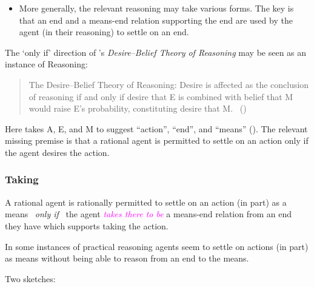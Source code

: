 \documentclass[10pt]{article}
\newenvironment{beamerblock}[1]{%
  \tcolorbox[standard,%
  no shadow,
  noparskip,
  colback=white,
  colframe=black,
  colbacktitle=white,
  coltitle=black,
  colupper=black,
  size=small,
  boxrule=.125mm,
  fonttitle=\bfseries,
  sharp corners=all,
  title=#1]}%
{\endtcolorbox}
\newcommand{\hozlinedash}[0]{%
  \noindent\hdashrule[0.5ex][c]{\textwidth}{.1pt}{2.5pt}
}
\newcommand{\schemaName}[1]{\textsf{#1}}
\begin{document}
\hozlinedash

\begin{itemize}
\item More generally, the relevant reasoning may take various forms.
  The key is that an end and a means-end relation supporting the end are used by the agent (in their reasoning) to settle on an end.
\end{itemize}

The `only if' direction of \citeauthor{Sinhababu:2017aa}'s \emph{Desire–Belief Theory of Reasoning} may be seen as an instance of \schemaName{Reasoning}:

\begin{quote}
  The Desire–Belief Theory of Reasoning: Desire is affected as the conclusion of reasoning if and only if desire that E is combined with belief that M would raise E’s probability, constituting desire that M.\nolinebreak
  \mbox{ }\hfill\mbox{(\citeyear[2,39]{Sinhababu:2017aa})}
\end{quote}
Here \citeauthor{Sinhababu:2017aa} takes A, E, and M to suggest ``action'', ``end'', and ``means'' (\citeyear[2]{Sinhababu:2017aa}).
The relevant missing premise is that a rational agent is permitted to settle on an action only if the agent desires the action.


\hozlinedash

\subsubsection{Taking}
\label{sec:taking}

\begin{beamerblock}{\schemaName{Taking}}
  A rational agent is rationally permitted to settle on an action (in part) as a means
  \newline
  \mbox{ }\hfill\emph{only if}\hfill\mbox{ }
  \newline
  the agent \textcolor{fuchsia}{\emph{takes there to be}} a means-end relation from an end they have which supports taking the action.
\end{beamerblock}

\hozlinedash

In some instances of practical reasoning agents seem to settle on actions (in part) as means without being able to reason from an end to the means.

Two sketches:
\end{document}
